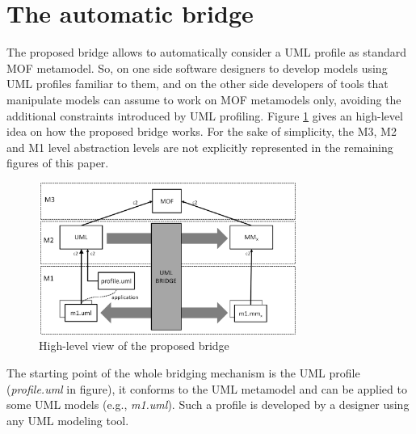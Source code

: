 \section{The automatic bridge}\label{sec:framework}
%
The proposed bridge allows to automatically consider a UML profile as standard MOF metamodel.
So, on one side software designers to develop models using UML profiles familiar to them, and on the other side 
developers of tools that manipulate models can assume to work on MOF metamodels only, avoiding the additional
constraints introduced by UML profiling.
Figure \ref{fig:overall} gives an high-level idea on how the proposed bridge works. 
For the sake of simplicity, the M3, M2 and M1 level abstraction levels are not explicitly represented in the remaining figures of this paper.

\begin{figure}[htbp]
	\centering
		\includegraphics[width=0.75\textwidth]{figures/overall.png}
	\caption{High-level view of the proposed bridge}
	\label{fig:overall}
\end{figure}

The starting point of the whole bridging mechanism is the UML profile  
(\textit{profile.uml} in figure), it conforms to the UML metamodel and can be applied to some UML models (e.g., \textit{m1.uml}).
Such a profile is developed by a designer using any UML modeling tool.

